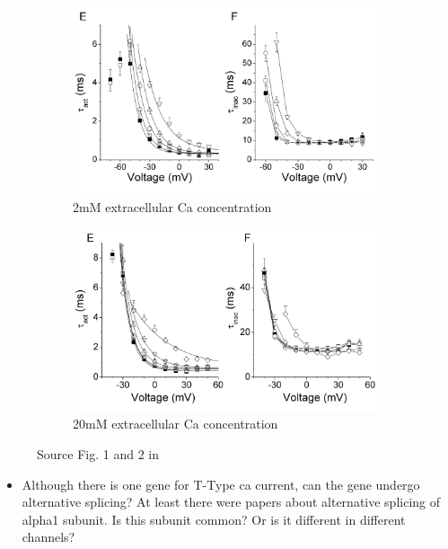 \documentclass[11pt]{article}
\begin{document}
\begin{figure}[H]
    \centering
    \begin{subfigure}[t]{0.48\textwidth}
        \centering
        \includegraphics[width=\textwidth]{./img/2025_01_15/ca_modul_of_t_type_talavera_2mm.png}
        \caption{2mM extracellular Ca concentration}
    \end{subfigure}
    \hfill
    \begin{subfigure}[t]{0.48\textwidth}
        \centering
        \includegraphics[width=\textwidth]{./img/2025_01_15/ca_modul_of_t_type_talavera_20mm.png}
        \caption{20mM extracellular Ca concentration}
    \end{subfigure}
    \label{fig:data_from_jeong}
    \caption{Source Fig. 1 and 2 in \cite{talaveraExtracellularCa2Modulates2003}}
\end{figure}

\color{red}
\begin{itemize}
    \item Although there is one gene for T-Type ca current, can the gene undergo alternative
    splicing? At least there were papers about alternative splicing of alpha1 subunit.
    Is this subunit common? Or is it different in different channels?
\end{itemize}
\color{black}
\end{document}

